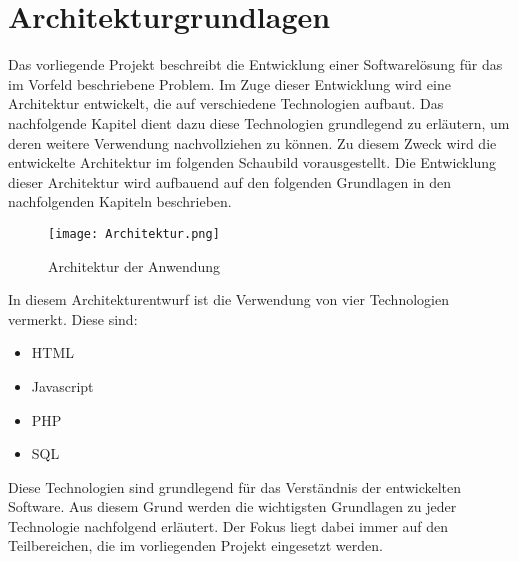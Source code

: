 \section{Architekturgrundlagen}
\label{sec:Architekturgrundlagen}

Das vorliegende Projekt beschreibt die Entwicklung einer Softwarelösung für das im Vorfeld beschriebene Problem.
Im Zuge dieser Entwicklung wird eine Architektur entwickelt, die auf verschiedene Technologien aufbaut.
Das nachfolgende Kapitel dient dazu diese Technologien grundlegend zu erläutern, um deren weitere Verwendung
nachvollziehen zu können. Zu diesem Zweck wird die entwickelte Architektur im folgenden Schaubild vorausgestellt.
Die Entwicklung dieser Architektur wird aufbauend auf den folgenden Grundlagen in den nachfolgenden Kapiteln beschrieben.

\begin{figure}[htb]
\centering
\texttt{[image: Architektur.png]}
\caption[Architektur der Anwendung]{Architektur der
Anwendung\protect\footnotemark}
\label{fig:Architektur}
\end{figure}


In diesem Architekturentwurf ist die Verwendung von vier Technologien vermerkt. Diese sind:
\begin{itemize}
  \item HTML
  \item Javascript
  \item PHP
  \item SQL
\end{itemize}

Diese Technologien sind grundlegend für das Verständnis der entwickelten Software.
Aus diesem Grund werden die wichtigsten Grundlagen zu jeder Technologie nachfolgend erläutert.
Der Fokus liegt dabei immer auf den Teilbereichen, die im vorliegenden Projekt eingesetzt werden.